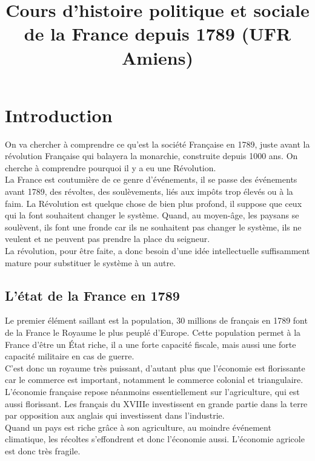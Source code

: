 \documentclass[10pt, a4paper, openany]{book}
\date{}
\title{Cours d'histoire politique et sociale de la France depuis 1789 (UFR Amiens)}
\begin{document}
\maketitle
\tableofcontents



\chapter{Introduction}

On va chercher à comprendre ce qu'est la société Française en 1789, juste avant la révolution Française qui balayera la monarchie, construite depuis 1000 ans. On cherche à comprendre pourquoi il y a eu une Révolution. \\
La France est coutumière de ce genre d'événements, il se passe des événements avant 1789, des révoltes, des soulèvements, liés aux impôts trop élevés ou à la faim. La Révolution est quelque chose de bien plus profond, il suppose que ceux qui la font souhaitent changer le système. Quand, au moyen-âge, les paysans se soulèvent, ils font une fronde car ils ne souhaitent pas changer le système, ils ne veulent et ne peuvent pas prendre la place du seigneur. \\
La révolution, pour être faite, a donc besoin d'une idée intellectuelle suffisamment mature pour substituer le système à un autre.

\section{L'état de la France en 1789}

Le premier élément saillant est la population, 30 millions de français en 1789 font de la France le Royaume le plus peuplé d'Europe. Cette population permet à la France d'être un État riche, il a une forte capacité fiscale, mais aussi une forte capacité militaire en cas de guerre. \\
C'est donc un royaume très puissant, d'autant plus que l'économie est florissante car le commerce est important, notamment le commerce colonial et triangulaire. L'économie française repose néanmoins essentiellement sur l'agriculture, qui est aussi florissant. Les français du XVIIIe investissent en grande partie dans la terre par opposition aux anglais qui investissent dans l'industrie. \\
Quand un pays est riche grâce à son agriculture, au moindre événement climatique, les récoltes s'effondrent et donc l'économie aussi. L'économie agricole est donc très fragile. 
\end{document}
